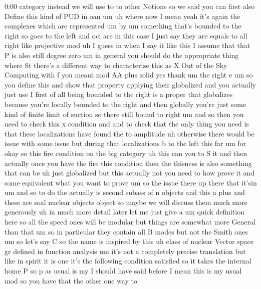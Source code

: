 \begin{unfinished}{0:00}
category  instead  we  will  use  to  to  other
Notions
so  we  said  you  can  first  also  Define
this  kind  of  PUD  in
oan
um
uh  where  now  I
mean  yeah  it's  again  the  complexes  which
are
represented  um
by  um  something
that's  bounded  to  the  right  so  goes  to
the
left  and
oci
are  in  this  case  I  just  say  they  are
equals
to  all  right  like  projective  mod  uh  I
guess  in  when  I  say  it  like  this  I
assume  that  that  P  is  also  still  degree
zero  um  in  general  you  should  do  the
appropriate  thing  where
St  there's  a  different  way  to
characterize  this
as  X  Out  of  the  Sky  Computing  with
f
you  meant  mod  AA  plus
solid  yes  thank
um  the
right
e
um  so  you  define  this
and  show  that
property  applying  their
globalized
and  you  actually  just  use  I  first  of  all
being  bounded  to  the  right  is  a  proper
that  globalizes  because  you're  locally
bounded  to  the  right  and  then  globally
you're  just  some  kind  of
finite  limit  of  suction  so  there  still
bound  to  right  um  and  so  then  you  need
to  check  this  x  condition  and  and  to
check  that  the  only  thing  you  need  is
that  these  localizations  have  found  the
to  amplitude  uh  otherwise  there  would  be
issue  with  some  issue  but  during  that
localizations  b  to  the  left  this  far
um
for
okay
so  this  fire  condition  on  the  big
category  uh  this  can  you  to  S  it  and
then  actually  once  you  have  the  fire
this
condition  then  the  thisness  is  also
something  that  can  be  uh  just  globalized
but  this
actually  not  you  need  to  how  prove  it
and  some  equivalent  what  you  want  to
prove  um  so  the  issue  there  up  there
that
it'sin
um  and
so  to  do  the  actually  is  second  subass
of  n  objects  and  this  a  plus  and  these
are  soal  nuclear
objects
object  so  maybe  we  will  discuss  them
much  more  generously  uh  in  much  more
detail  later  let  me  just  give  a  um  quick
definition
here  so  all  the  speed  ones  will  be
modular  but  things  are  somewhat  more
General  than  that  um  so  in  particular
they  contain  all  B  modes  but  not  the
Smith  ones
um  so  let's  say
C  so  the  name  is  inspired  by  this  uh
class  of  nuclear  Vector  space  gr  defined
in  function
analysis
um  it's  not  a  completely  precise
translation  but  like  in  spirit  it  is
one
it's  the  following  condition  satisfied
so  it  takes
the  internal
home
P  so  p  as  usual  is  my  I  should  have  said
before  I  mean  this  is  my
usual
mod
so  you  have  that  the  other  one  way  to

\end{unfinished}
